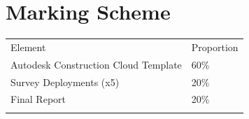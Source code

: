 \section*{Marking Scheme}
\begin{table}[h!]
	\begin{center}
		\begin{tabular}{p{8cm}  p{2cm} }
			\toprule
			\large{Element} & \large{Proportion} \\ 
			\cmidrule(r){1-1}\cmidrule(lr){2-2}
			Autodesk Construction Cloud Template & 60\%\\
			Survey Deployments (x5) & 20\%\\
			Final Report & 20\%\\     
			\\ \bottomrule
		\end{tabular}
		\label{tbl:markSchemeAsmt3}
	\end{center}
\end{table}


